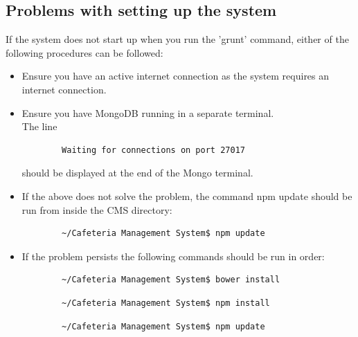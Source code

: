 \documentclass[a4paper,12pt]{report}
\begin{document}
\subsection{Problems with setting up the system}
If the system does not start up when you run the 'grunt' command, either of the following procedures can be followed:
\begin{itemize}
\item Ensure you have an active internet connection as the system requires an internet connection.
\item Ensure you have MongoDB running in a separate terminal. \\
	The line \begin{verbatim}
		Waiting for connections on port 27017
	\end{verbatim} should be displayed at the end of the Mongo terminal.
\item If the above does not solve the problem, the command npm update should be run from inside the CMS directory:
	\begin{verbatim}
		~/Cafeteria Management System$ npm update
	\end{verbatim}
\item If the problem persists the following commands should be run in order:
	\begin{verbatim}
		~/Cafeteria Management System$ bower install
	\end{verbatim} 
	\begin{verbatim}
		~/Cafeteria Management System$ npm install
	\end{verbatim} 
	\begin{verbatim}
		~/Cafeteria Management System$ npm update
	\end{verbatim}
\end{itemize}
\end{document}
